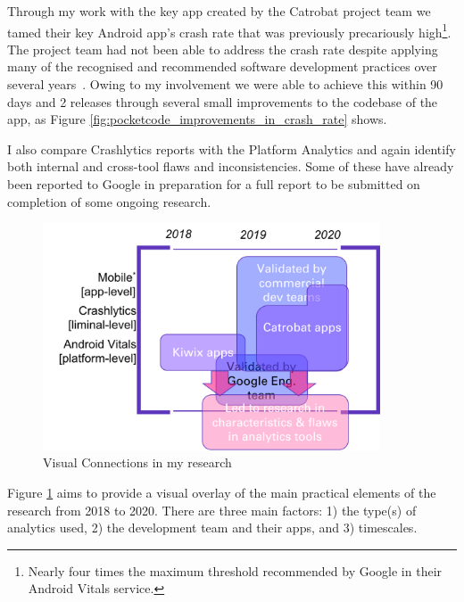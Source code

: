 Through my work with the key app created by the Catrobat project team we tamed their key Android app's crash rate that was previously precariously high\footnote{Nearly four times the maximum threshold recommended by Google in their Android Vitals service.}. The project team had not been able to address the crash rate despite applying many of the recognised and recommended software development practices over several years~\cite{adamsen2015systematic_catrobat, luhana2018streamlining, ali2019behavior_catrobat, ali2019using_catrobat, hirsch2019approach_catrobat, schranz2019contributors_catrobat, slany2014tinkering}. Owing to my involvement we were able to achieve this within 90 days and 2 releases through several small improvements to the codebase of the app, as Figure \ref{fig:pocketcode_improvements_in_crash_rate} shows.


I also compare Crashlytics reports with the Platform Analytics and again identify both internal and cross-tool flaws and inconsistencies. Some of these have already been reported to Google in preparation for a full report to be submitted on completion of some ongoing research.

\begin{figure}[ht]
    \centering
    \includegraphics[width=10cm]{images/visual-connections-in-research.png}
    \caption{Visual Connections in my research}
    \label{fig:visual-connections-in-research}
\end{figure}

Figure \ref{fig:visual-connections-in-research}  aims to provide a visual overlay of the main practical elements of the research from 2018 to 2020. There are three main factors: 1) the type(s) of analytics used, 2) the development team and their apps, and 3) timescales.

